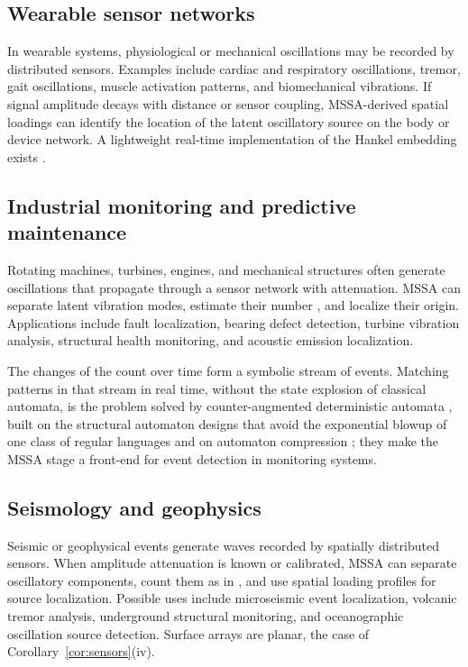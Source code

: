 \documentclass{article}
\begin{document}
\subsection{Wearable sensor networks}\label{sec:wearable-sensor-networks}

In wearable systems, physiological or mechanical oscillations may be recorded by distributed sensors. Examples include cardiac and respiratory oscillations, tremor, gait oscillations, muscle activation patterns, and biomechanical vibrations. If signal amplitude decays with distance or sensor coupling, MSSA-derived spatial loadings can identify the location of the latent oscillatory source on the body or device network. A lightweight real-time implementation of the Hankel embedding exists \cite{ref-Bernadotte06}.

\subsection{Industrial monitoring and predictive maintenance}\label{sec:industrial-monitoring-and-predictive}

Rotating machines, turbines, engines, and mechanical structures often generate oscillations that propagate through a sensor network with attenuation. MSSA can separate latent vibration modes, estimate their number \cite{ref-BernadotteBuchstaber}, and localize their origin. Applications include fault localization, bearing defect detection, turbine vibration analysis, structural health monitoring, and acoustic emission localization.

The changes of the count over time form a symbolic stream of events. Matching patterns in that stream in real time, without the state explosion of classical automata, is the problem solved by counter-augmented deterministic automata \cite{ref-Automata, ref-Regex}, built on the structural automaton designs that avoid the exponential blowup of one class of regular languages \cite{ref-BernadotteAutomata, ref-ISStruct} and on automaton compression \cite{ref-ISCompress}; they make the MSSA stage a front-end for event detection in monitoring systems.

\subsection{Seismology and geophysics}\label{sec:seismology-and-geophysics}

Seismic or geophysical events generate waves recorded by spatially distributed sensors. When amplitude attenuation is known or calibrated, MSSA can separate oscillatory components, count them as in \cite{ref-BernadotteBuchstaber}, and use spatial loading profiles for source localization. Possible uses include microseismic event localization, volcanic tremor analysis, underground structural monitoring, and oceanographic oscillation source detection. Surface arrays are planar, the case of Corollary~\ref{cor:sensors}(iv).
\end{document}
